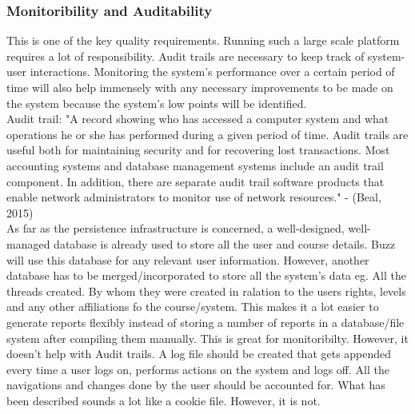 \subsubsection{Monitoribility and Auditability}
This is one of the key  quality requirements. Running such a large scale platform requires a lot of responsibility. Audit trails are necessary to keep track of system-user interactions. Monitoring the system's performance over a certain period of time will also help immensely with any necessary improvements to be made on the system because the system's low points will be identified.\\
Audit trail: "A record showing who has accessed a computer system and what operations he or she has performed during a given period of time. Audit trails are useful both for maintaining security and for recovering lost transactions. Most accounting systems and database management systems include an audit trail component. In addition, there are separate audit trail software products that enable network administrators to monitor use of network resources." - (Beal, 2015)\\
As far as the persistence infrastructure is concerned, a well-designed, well-managed database is already used to store all the user and course details. Buzz will use this database for any relevant user information. However,  another database has to be merged/incorporated to store all the system's data eg. All the threads created. By whom they were created in ralation to the users rights, levels and any other affiliations fo the course/system. This makes it a lot easier to generate reports flexibly instead of storing a number of reports in a database/file system after compiling them manually. This is great for monitoribilty. However, it doesn't help with Audit trails. A log file should be created that gets appended every time a user logs on, performs actions on the system and logs off. All the navigations and changes done by the user should be accounted for. What has been described sounds a lot like a cookie file. However, it is not.\\
\\
